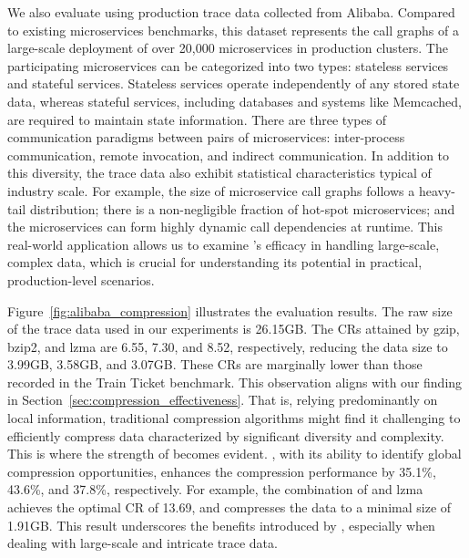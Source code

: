 We also evaluate \alias using production trace data collected from Alibaba. Compared to existing microservices benchmarks, this dataset represents the call graphs of a large-scale deployment of over 20,000 microservices in production clusters. The participating microservices can be categorized into two types: stateless services and stateful services. Stateless services operate independently of any stored state data, whereas stateful services, including databases and systems like Memcached, are required to maintain state information.
There are three types of communication paradigms between pairs of microservices: inter-process communication, remote invocation, and indirect communication. In addition to this diversity, the trace data also exhibit statistical characteristics typical of industry scale. For example, the size of microservice call graphs follows a heavy-tail distribution; there is a non-negligible fraction of hot-spot microservices; and the microservices can form highly dynamic call dependencies at runtime.
This real-world application allows us to examine \alias's efficacy in handling large-scale, complex data, which is crucial for understanding its potential in practical, production-level scenarios.

Figure~\ref{fig:alibaba_compression} illustrates the evaluation results.
The raw size of the trace data used in our experiments is 26.15GB.
The CRs attained by gzip, bzip2, and lzma are 6.55, 7.30, and 8.52, respectively, reducing the data size to 3.99GB, 3.58GB, and 3.07GB.
These CRs are marginally lower than those recorded in the Train Ticket benchmark.
This observation aligns with our finding in Section~\ref{sec:compression_effectiveness}.
That is, relying predominantly on local information, traditional compression algorithms might find it challenging to efficiently compress data characterized by significant diversity and complexity.
This is where the strength of \alias becomes evident.
\alias, with its ability to identify global compression opportunities, enhances the compression performance by 35.1\%, 43.6\%, and 37.8\%, respectively.
For example, the combination of \alias and lzma achieves the optimal CR of 13.69, and compresses the data to a minimal size of 1.91GB.
This result underscores the benefits introduced by \alias, especially when dealing with large-scale and intricate trace data.


